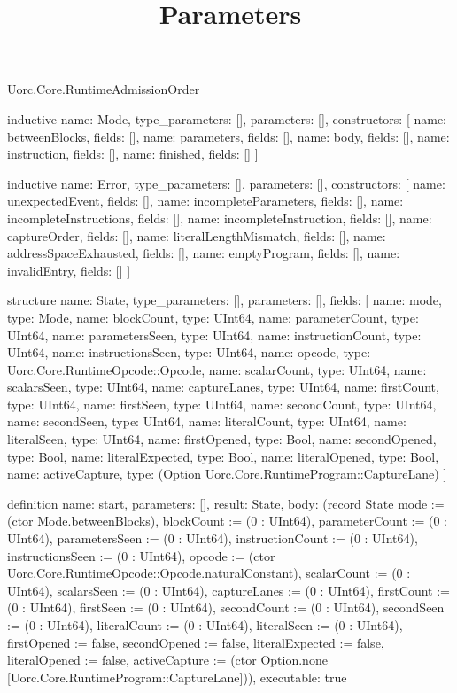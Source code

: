 \begin{lexlean}{Uorc.Core.RuntimeAdmissionOrder}
\title{Parameters}
\begin{semanticmodule}
inductive{
  name: Mode,
  type_parameters: [],
  parameters: [],
  constructors: [
    {name: betweenBlocks, fields: []},
    {name: parameters, fields: []},
    {name: body, fields: []},
    {name: instruction, fields: []},
    {name: finished, fields: []}
  ]
}

inductive{
  name: Error,
  type_parameters: [],
  parameters: [],
  constructors: [
    {name: unexpectedEvent, fields: []},
    {name: incompleteParameters, fields: []},
    {name: incompleteInstructions, fields: []},
    {name: incompleteInstruction, fields: []},
    {name: captureOrder, fields: []},
    {name: literalLengthMismatch, fields: []},
    {name: addressSpaceExhausted, fields: []},
    {name: emptyProgram, fields: []},
    {name: invalidEntry, fields: []}
  ]
}

structure{
  name: State,
  type_parameters: [],
  parameters: [],
  fields: [
    {name: mode, type: Mode},
    {name: blockCount, type: UInt64},
    {name: parameterCount, type: UInt64},
    {name: parametersSeen, type: UInt64},
    {name: instructionCount, type: UInt64},
    {name: instructionsSeen, type: UInt64},
    {name: opcode, type: Uorc.Core.RuntimeOpcode::Opcode},
    {name: scalarCount, type: UInt64},
    {name: scalarsSeen, type: UInt64},
    {name: captureLanes, type: UInt64},
    {name: firstCount, type: UInt64},
    {name: firstSeen, type: UInt64},
    {name: secondCount, type: UInt64},
    {name: secondSeen, type: UInt64},
    {name: literalCount, type: UInt64},
    {name: literalSeen, type: UInt64},
    {name: firstOpened, type: Bool},
    {name: secondOpened, type: Bool},
    {name: literalExpected, type: Bool},
    {name: literalOpened, type: Bool},
    {name: activeCapture, type: (Option Uorc.Core.RuntimeProgram::CaptureLane)}
  ]
}

definition{
  name: start,
  parameters: [],
  result: State,
  body: (record State {mode := (ctor Mode.betweenBlocks), blockCount := (0 : UInt64), parameterCount := (0 : UInt64), parametersSeen := (0 : UInt64), instructionCount := (0 : UInt64), instructionsSeen := (0 : UInt64), opcode := (ctor Uorc.Core.RuntimeOpcode::Opcode.naturalConstant), scalarCount := (0 : UInt64), scalarsSeen := (0 : UInt64), captureLanes := (0 : UInt64), firstCount := (0 : UInt64), firstSeen := (0 : UInt64), secondCount := (0 : UInt64), secondSeen := (0 : UInt64), literalCount := (0 : UInt64), literalSeen := (0 : UInt64), firstOpened := false, secondOpened := false, literalExpected := false, literalOpened := false, activeCapture := (ctor Option.none [Uorc.Core.RuntimeProgram::CaptureLane])}),
  executable: true
}


\end{semanticmodule}
\end{lexlean}
